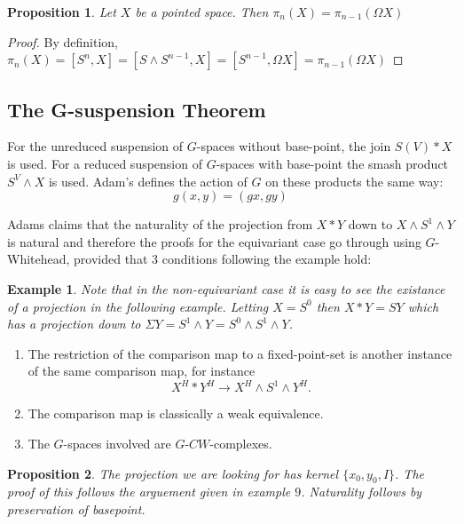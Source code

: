 \documentclass{article}
\theoremstyle{problemstyle}
\theoremstyle{problemstyle}
\theoremstyle{problemstyle}
\newtheorem{example}{Example}
\theoremstyle{problemstyle}
\theoremstyle{problemstyle}
\newtheorem{proposition}{Proposition}
\theoremstyle{problemstyle}
\begin{document}
\begin{proposition}
Let $X$ be a pointed space. Then $\pi_n(X) = \pi_{n-1}(\Omega X)$
\end{proposition}

\begin{proof}
By definition, $\pi_n(X) = [S^n,X] = [S \wedge S^{n-1},X]  = [S^{n-1},\Omega X] = \pi_{n-1}(\Omega X)$
\end{proof}

\subsection{The G-suspension Theorem}

For the unreduced suspension of $G$-spaces without base-point, the join $S(V)*X$ is used. For a reduced suspension of $G$-spaces with base-point the smash product $S^V \wedge X$ is used. Adam's defines the action of $G$ on these products the same way: $$g(x,y) = (gx,gy)$$   

Adams claims that the naturality of the projection from $X * Y$ down to $X \wedge S^1 \wedge Y$ is natural and therefore the proofs for the equivariant case go through using $G$-Whitehead, provided that $3$ conditions following the example hold: 

\begin{example}
Note that in the non-equivariant case it is easy to see the existance of a projection in the following example. Letting $X = S^0$ then $X * Y = SY$ which has a projection down to $\Sigma Y = S^1 \wedge Y = S^0 \wedge S^1 \wedge Y$. 
\end{example}

\begin{enumerate}
\item The restriction of the comparison map to a fixed-point-set is another instance of the same comparison map, for instance $$X^H * Y^H \rightarrow X^H \wedge S^1 \wedge Y^H.$$
\item The comparison map is classically a weak equivalence.
\item The $G$-spaces involved are $G$-$CW$-complexes. 
\end{enumerate}

\begin{proposition}
The projection we are looking for has kernel $\{x_0,y_0,I\}$. The proof of this follows the arguement given in example $9$. Naturality follows by preservation of basepoint. 
\end{proposition}
\end{document}
